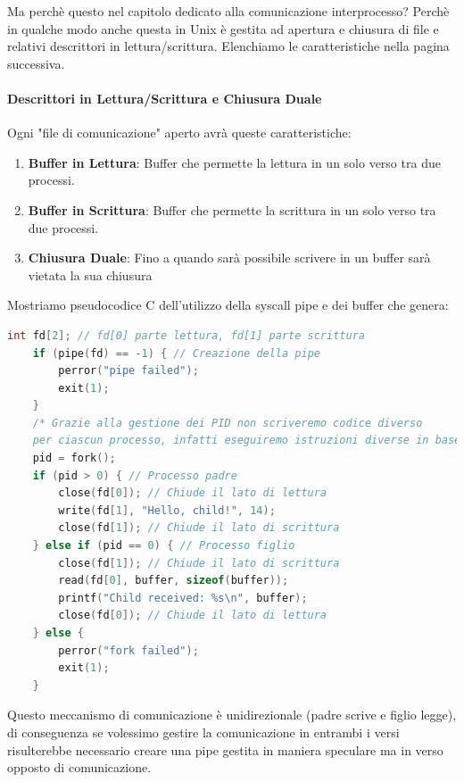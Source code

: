 \documentclass{article}
\begin{document}
Ma perchè questo nel capitolo dedicato alla comunicazione interprocesso? Perchè in qualche modo anche questa in Unix è gestita ad apertura e chiusura
di file e relativi descrittori in lettura/scrittura. Elenchiamo le caratteristiche nella pagina successiva.

\newpage

\paragraph{Descrittori in Lettura/Scrittura e Chiusura Duale} Ogni "file di comunicazione" aperto avrà queste caratteristiche:

\begin{enumerate}
    \item \textbf{Buffer in Lettura}: Buffer che permette la lettura in un solo verso tra due processi.
    \item \textbf{Buffer in Scrittura}: Buffer che permette la scrittura in un solo verso tra due processi.
    \item \textbf{Chiusura Duale}: Fino a quando sarà possibile scrivere in un buffer sarà vietata la sua chiusura
\end{enumerate}

Mostriamo pseudocodice C dell'utilizzo della syscall pipe e dei buffer che genera:

\vspace*{10px}
\begin{lstlisting}[language = C]
    int fd[2]; // fd[0] parte lettura, fd[1] parte scrittura
    if (pipe(fd) == -1) { // Creazione della pipe
        perror("pipe failed");
        exit(1);
    }
    /* Grazie alla gestione dei PID non scriveremo codice diverso
    per ciascun processo, infatti eseguiremo istruzioni diverse in base al valore del PID */
    pid = fork();
    if (pid > 0) { // Processo padre
        close(fd[0]); // Chiude il lato di lettura
        write(fd[1], "Hello, child!", 14);
        close(fd[1]); // Chiude il lato di scrittura
    } else if (pid == 0) { // Processo figlio
        close(fd[1]); // Chiude il lato di scrittura
        read(fd[0], buffer, sizeof(buffer));
        printf("Child received: %s\n", buffer);
        close(fd[0]); // Chiude il lato di lettura
    } else {
        perror("fork failed");
        exit(1);
    }
\end{lstlisting}

Questo meccanismo di comunicazione è unidirezionale (padre scrive e figlio legge), di conseguenza se volessimo gestire la comunicazione in entrambi i versi
risulterebbe necessario creare una pipe gestita in maniera speculare ma in verso opposto di comunicazione.
\end{document}
